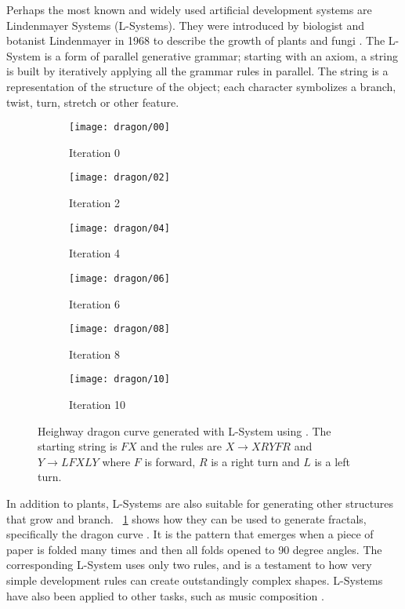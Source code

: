 Perhaps the most known and widely used artificial development systems are Lindenmayer Systems (L-Systems).
They were introduced by biologist and botanist Lindenmayer in 1968 to describe the growth of plants and fungi \cite{lindenmayer1968models}.
The L-System is a form of parallel generative grammar; starting with an axiom, a string is built by iteratively applying all the grammar rules in parallel.
The string is a representation of the structure of the object; each character symbolizes a branch, twist, turn, stretch or other feature.

\begin{figure}[!ht]
    \centering
    \begin{subfigure}{0.32\textwidth}
        \centering
        \texttt{[image: dragon/00]}
        \caption{Iteration 0}
    \end{subfigure}
    \begin{subfigure}{0.32\textwidth}
        \centering
        \texttt{[image: dragon/02]}
        \caption{Iteration 2}
    \end{subfigure}
    \begin{subfigure}{0.32\textwidth}
        \centering
        \texttt{[image: dragon/04]}
        \caption{Iteration 4}
    \end{subfigure}
    \par\bigskip
    \begin{subfigure}{0.32\textwidth}
        \centering
        \texttt{[image: dragon/06]}
        \caption{Iteration 6}
    \end{subfigure}
    \begin{subfigure}{0.32\textwidth}
        \centering
        \texttt{[image: dragon/08]}
        \caption{Iteration 8}
    \end{subfigure}
    \begin{subfigure}{0.32\textwidth}
        \centering
        \texttt{[image: dragon/10]}
        \caption{Iteration 10}
    \end{subfigure}
    \caption[Dragon curve]{
        Heighway dragon curve generated with L-System using \cite{lsystemgenerator}.
        The starting string is $FX$ and the rules are $X \rightarrow XRYFR$ and $Y \rightarrow LFXLY$ where $F$ is forward, $R$ is a right turn and $L$ is a left turn.
    }
    \label{fig:dragon-curve}
\end{figure}

In addition to plants, L-Systems are also suitable for generating other structures that grow and branch.
\figurename~\ref{fig:dragon-curve} shows how they can be used to generate fractals, specifically the dragon curve \cite{gardner1967heighway}.
It is the pattern that emerges when a piece of paper is folded many times and then all folds opened to 90 degree angles.
The corresponding L-System uses only two rules, and is a testament to how very simple development rules can create outstandingly complex shapes.
L-Systems have also been applied to other tasks, such as music composition \cite{manousakis2006musical}.

